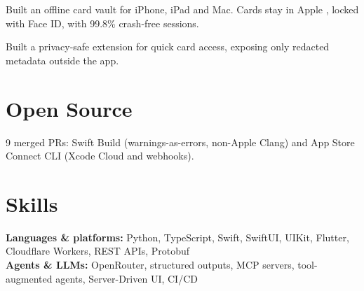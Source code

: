\documentclass{fonts}
\begin{document}
\textbf{\href{https://apps.apple.com/us/app/offline-card-vault-holder/id6475649492}{}}
\begin{tightemize}
    \item Built an offline card vault for iPhone, iPad and Mac. Cards stay in Apple , locked with Face ID, with 99.8\% crash-free sessions.
    \item Built a privacy-safe  extension for quick card access, exposing only redacted metadata outside the app.
\end{tightemize}


\section{Open Source}

\textbf{}
\begin{tightemize}
    \item 9 merged PRs: Swift Build (warnings-as-errors, non-Apple Clang) and App Store Connect CLI (Xcode Cloud and webhooks).
\end{tightemize}

\section{Skills}

\noindent
\textbf{Languages \& platforms:} Python, TypeScript, Swift, SwiftUI, UIKit, Flutter, Cloudflare Workers, REST APIs, Protobuf \\
\noindent
\textbf{Agents \& LLMs:} OpenRouter, structured outputs, MCP servers, tool-augmented agents, Server-Driven UI, CI/CD

\end{document}
